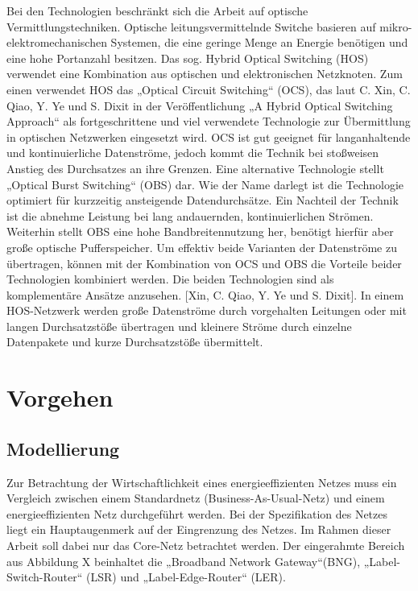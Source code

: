 \documentclass[12pt,titlepage]{article}
\begin{document}
Bei den Technologien beschränkt sich die Arbeit auf optische Vermittlungstechniken. Optische leitungsvermittelnde Switche basieren auf mikro-elektromechanischen Systemen, die eine geringe Menge an Energie benötigen und eine hohe Portanzahl besitzen. Das sog. Hybrid Optical Switching (HOS) verwendet eine Kombination aus optischen und elektronischen Netzknoten. Zum einen verwendet HOS das „Optical Circuit Switching“ (OCS), das laut C. Xin, C. Qiao, Y. Ye und S. Dixit in der Veröffentlichung „A Hybrid Optical Switching Approach“ als fortgeschrittene und viel verwendete Technologie zur Übermittlung in optischen Netzwerken eingesetzt wird. OCS ist gut geeignet für langanhaltende und kontinuierliche Datenströme, jedoch kommt die Technik bei stoßweisen Anstieg des Durchsatzes an ihre Grenzen. Eine alternative Technologie stellt „Optical Burst Switching“ (OBS) dar. Wie der Name darlegt ist die Technologie optimiert für kurzzeitig ansteigende Datendurchsätze. Ein Nachteil der Technik ist die abnehme Leistung bei lang andauernden, kontinuierlichen Strömen. Weiterhin stellt OBS eine hohe Bandbreitennutzung her, benötigt hierfür aber große optische Pufferspeicher. Um effektiv beide Varianten der Datenströme zu übertragen, können mit der Kombination von OCS und OBS die Vorteile beider Technologien kombiniert werden. Die beiden Technologien sind als komplementäre Ansätze anzusehen. [Xin, C. Qiao, Y. Ye und S. Dixit]. In einem HOS-Netzwerk werden große Datenströme durch vorgehalten Leitungen oder mit langen Durchsatzstöße übertragen und kleinere Ströme durch einzelne Datenpakete und kurze Durchsatzstöße übermittelt.

\section{Vorgehen}

\subsection{Modellierung}
Zur Betrachtung der Wirtschaftlichkeit eines energieeffizienten Netzes muss ein Vergleich zwischen einem Standardnetz (Business-As-Usual-Netz) und einem energieeffizienten Netz durchgeführt werden. Bei der Spezifikation des Netzes liegt ein Hauptaugenmerk auf der Eingrenzung des Netzes. Im Rahmen dieser Arbeit soll dabei nur das Core-Netz betrachtet werden. Der eingerahmte Bereich aus Abbildung X beinhaltet die „Broadband Network Gateway“(BNG), „Label-Switch-Router“ (LSR) und „Label-Edge-Router“ (LER).
\end{document}

